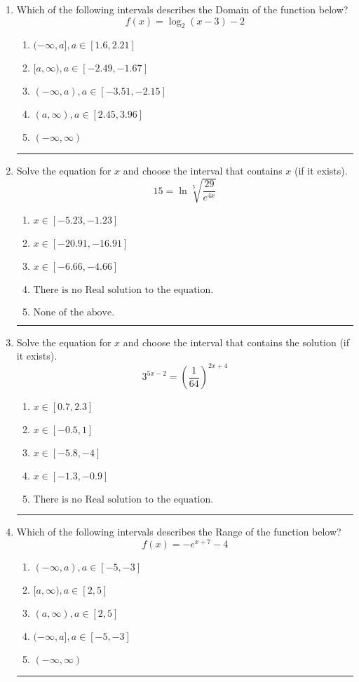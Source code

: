 \documentclass[14pt]{extbook}
\newcommand{\litem}[1]{\item#1\hspace*{-1cm}\rule{\textwidth}{0.4pt}}
\begin{document}
\begin{enumerate}
{\begin{enumerate}[label=\Alph*.]
\end{enumerate} }
\litem{
Which of the following intervals describes the Domain of the function below?\[ f(x) = \log_2{(x-3)}-2 \]\begin{enumerate}[label=\Alph*.]
\item \( (-\infty, a], a \in [1.6, 2.21] \)
\item \( [a, \infty), a \in [-2.49, -1.67] \)
\item \( (-\infty, a), a \in [-3.51, -2.15] \)
\item \( (a, \infty), a \in [2.45, 3.96] \)
\item \( (-\infty, \infty) \)

\end{enumerate} }
\litem{
 Solve the equation for $x$ and choose the interval that contains $x$ (if it exists).\[  15 = \ln{\sqrt[5]{\frac{29}{e^{4x}}}} \]\begin{enumerate}[label=\Alph*.]
\item \( x \in [-5.23, -1.23] \)
\item \( x \in [-20.91, -16.91] \)
\item \( x \in [-6.66, -4.66] \)
\item \( \text{There is no Real solution to the equation.} \)
\item \( \text{None of the above.} \)

\end{enumerate} }
\litem{
Solve the equation for $x$ and choose the interval that contains the solution (if it exists).\[ 3^{5x-2} = \left(\frac{1}{64}\right)^{2x+4} \]\begin{enumerate}[label=\Alph*.]
\item \( x \in [0.7, 2.3] \)
\item \( x \in [-0.5, 1] \)
\item \( x \in [-5.8, -4] \)
\item \( x \in [-1.3, -0.9] \)
\item \( \text{There is no Real solution to the equation.} \)

\end{enumerate} }
\litem{
Which of the following intervals describes the Range of the function below?\[ f(x) = -e^{x+7}-4 \]\begin{enumerate}[label=\Alph*.]
\item \( (-\infty, a), a \in [-5, -3] \)
\item \( [a, \infty), a \in [2, 5] \)
\item \( (a, \infty), a \in [2, 5] \)
\item \( (-\infty, a], a \in [-5, -3] \)
\item \( (-\infty, \infty) \)


\end{enumerate}}
\end{enumerate}
\end{document}
